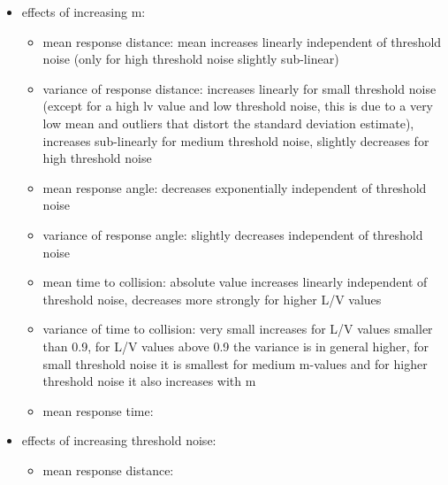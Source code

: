 \documentclass[a4paper,10pt]{scrartcl}
\begin{document}
	\begin{itemize}
		\item effects of increasing m:
		\begin{itemize}
			\item mean response distance: mean increases linearly independent 
			of threshold noise (only for high threshold noise slightly 
			sub-linear)
			\item variance of response distance: increases linearly for small 
			threshold noise (except for a high lv value and low threshold 
			noise, this is due to a very low mean and outliers that distort the 
			standard deviation estimate), increases sub-linearly for medium 
			threshold noise, slightly decreases for high threshold noise
			\item mean response angle: decreases exponentially  independent of 
			threshold noise
			\item variance of response angle: slightly decreases independent of 
			threshold noise
			\item mean time to collision: absolute value increases linearly 
			independent of threshold noise, decreases more strongly for higher 
			L/V values
			\item variance of time to collision: very small increases for L/V 
			values smaller than 0.9, for L/V values above 0.9 the variance is 
			in general higher, for small threshold noise it is smallest for 
			medium m-values and for higher threshold noise it also increases 
			with m
			\item mean response time: 
		\end{itemize}
		\item effects of increasing threshold noise:
		\begin{itemize}
			\item mean response distance: 
		\end{itemize}
	\end{itemize}
\end{document}
